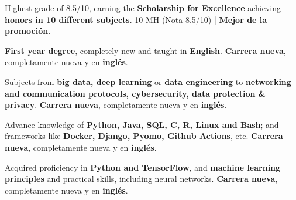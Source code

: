 \documentclass[]{cv}
\begin{document}
\begin{minipage}[t][0pt]{\linewidth}
\begin{minipage}[t]{0.57\textwidth}
\begin{tightemize}
\item \dumblang
  {Highest grade of 8.5/10, earning the \textbf{Scholarship for Excellence} achieving \textbf{honors in 10 different subjects}.}
  {10 MH (Nota 8.5/10) | \textbf{Mejor de la promoción}.}
\item \dumblang
  {\textbf{First year degree}, completely new and taught in \textbf{English}.}
  {\textbf{Carrera nueva}, completamente nueva y en \textbf{inglés}.}
\item \dumblang
    {Subjects from \textbf{big data, deep learning} or \textbf{data engineering} to \textbf{networking and communication protocols, cybersecurity, data protection \& privacy}.}
  {\textbf{Carrera nueva}, completamente nueva y en \textbf{inglés}.}
\item \dumblang
  {Advance knowledge of \textbf{Python, Java, SQL, C, R, Linux and Bash}; and frameworks like \textbf{Docker, Django, Pyomo, Github Actions}, etc.}
  {\textbf{Carrera nueva}, completamente nueva y en \textbf{inglés}.}
\end{tightemize}

\begin{tightemize}
\item \dumblang
    {Acquired proficiency in \textbf{Python and TensorFlow}, and \textbf{machine learning principles} and practical skills, including neural networks.}
  {\textbf{Carrera nueva}, completamente nueva y en \textbf{inglés}.}
\end{tightemize}



%
%


\end{minipage}
\end{minipage}
\end{document}
